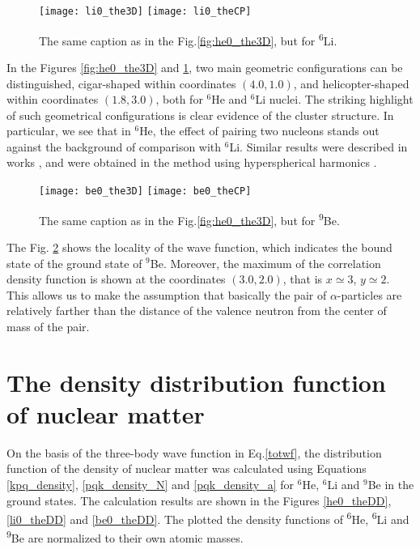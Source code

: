 \documentclass[
12pt, %
oneside, %
english, %
onehalfspacing, %
onehalfspacing, %
headsepline, %
]{MastersDoctoralThesis} %
\newcommand{\he}{\textsuperscript{6}He\xspace}
\newcommand{\li}{\textsuperscript{6}Li\xspace}
\newcommand{\be}{\textsuperscript{9}Be\xspace}
\begin{document}
\begin{figure}[bp]
\centering
\texttt{[image: li0\_the3D]}
\texttt{[image: li0\_theCP]}
\decoRule
\caption{ \footnotesize The same caption as in the Fig.\ref{fig:he0_the3D}, but for \li.}
\label{fig:li0_the3D}
\end{figure} 

In the Figures \ref{fig:he0_the3D} and \ref{fig:li0_the3D}, two main geometric configurations can be distinguished, cigar-shaped within coordinates $(4.0, 1.0)$, and helicopter-shaped within coordinates $(1.8, 3.0)$, both for $^6$He and  $^6$Li nuclei. The striking highlight of such geometrical configurations is clear evidence of the cluster structure. In particular, we see that in $^6$He, the effect of pairing two nucleons stands out against the background of comparison with $^6$Li. Similar results were described in works \cite{kukulin1977stochastic}, and were obtained in the method using hyperspherical harmonics \cite{zhukov1993bound}. 

\begin{figure}[tp]
\centering
\texttt{[image: be0\_the3D]}
\texttt{[image: be0\_theCP]}
\decoRule
\caption{ \footnotesize The same caption as in the Fig.\ref{fig:he0_the3D}, but for \be.}
\label{fig:be0_the3D}
\end{figure} 


The Fig. \ref{fig:be0_the3D} shows the locality of the wave function, which indicates the bound state of the ground state of $^9$Be. Moreover, the maximum of the correlation density function is shown at the coordinates $(3.0, 2.0)$, that is $x \simeq 3$, $y \simeq 2$. This allows us to make the assumption that basically the pair of $\alpha$-particles are relatively farther than the distance of the valence neutron from the center of mass of the pair. 

\section{The density distribution function of nuclear matter}
On the basis of the three-body wave function in Eq.\ref{totwf}, the distribution function of the density of nuclear matter was calculated using Equations \ref{kpq_density}, \ref{pqk_density_N} and \ref{pqk_density_a} for $^6$He, $^6$Li and $^9$Be in the ground states. The calculation results are shown in the Figures \ref{he0_theDD}, \ref{li0_theDD} and \ref{be0_theDD}.
The plotted the density functions of \he, \li and \be  are normalized to their own atomic masses. 
\end{document}
